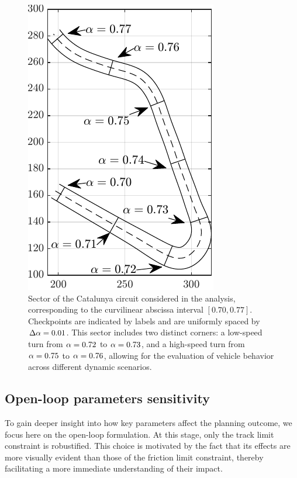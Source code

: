 \begin{figure}
	\centering
	\includegraphics{Fig/track.pdf}
	\caption{Sector of the Catalunya circuit considered in the analysis, corresponding to the curvilinear abscissa interval $\left[0.70, 0.77\right]$. Checkpoints are indicated by labels and are uniformly spaced by $\Delta\alpha=0.01$. This sector includes two distinct corners: a low-speed turn from $\alpha = 0.72$ to $\alpha = 0.73$, and a high-speed turn from $\alpha = 0.75$ to $\alpha = 0.76$, allowing for the evaluation of vehicle behavior across different dynamic scenarios.}
	\label{fig:track}
\end{figure}

\subsection{Open-loop parameters sensitivity}
\label{sec:ol_param_sensitivity}
To gain deeper insight into how key parameters affect the planning outcome, we focus here on the open-loop formulation.
At this stage, only the track limit constraint is robustified. 
This choice is motivated by the fact that its effects are more visually evident than those of the friction limit constraint, thereby facilitating a more immediate understanding of their impact. 

